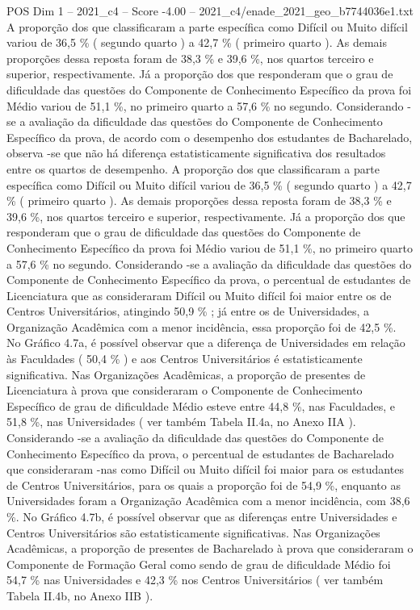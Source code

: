 \begin{textsample}{POS Dim 1 – 2021\_c4 – Score -4.00 – 2021\_c4/enade\_2021\_geo\_b7744036e1.txt}
A proporção dos que classificaram a parte específica como Difícil ou Muito difícil variou de 36,5 \% ( segundo quarto ) a 42,7 \% ( primeiro quarto ).
As demais proporções dessa reposta foram de 38,3 \% e 39,6 \%, nos quartos terceiro e superior, respectivamente.
Já a proporção dos que responderam que o grau de dificuldade das questões do Componente de Conhecimento Específico da prova foi Médio variou de 51,1 \%, no primeiro quarto a 57,6 \% no segundo.
Considerando -se a avaliação da dificuldade das questões do Componente de Conhecimento Específico da prova, de acordo com o desempenho dos estudantes de Bacharelado, observa -se que não há diferença estatisticamente significativa dos resultados entre os quartos de desempenho.
A proporção dos que classificaram a parte específica como Difícil ou Muito difícil variou de 36,5 \% ( segundo quarto ) a 42,7 \% ( primeiro quarto ).
As demais proporções dessa reposta foram de 38,3 \% e 39,6 \%, nos quartos terceiro e superior, respectivamente.
Já a proporção dos que responderam que o grau de dificuldade das questões do Componente de Conhecimento Específico da prova foi Médio variou de 51,1 \%, no primeiro quarto a 57,6 \% no segundo.
Considerando -se a avaliação da dificuldade das questões do Componente de Conhecimento Específico da prova, o percentual de estudantes de Licenciatura que as consideraram Difícil ou Muito difícil foi maior entre os de Centros Universitários, atingindo 50,9 \% ; já entre os de Universidades, a Organização Acadêmica com a menor incidência, essa proporção foi de 42,5 \%.
No Gráfico 4.7a, é possível observar que a diferença de Universidades em relação às Faculdades ( 50,4 \% ) e aos Centros Universitários é estatisticamente significativa.
Nas Organizações Acadêmicas, a proporção de presentes de Licenciatura à prova que consideraram o Componente de Conhecimento Específico de grau de dificuldade Médio esteve entre 44,8 \%, nas Faculdades, e 51,8 \%, nas Universidades ( ver também Tabela II.4a, no Anexo IIA ).
Considerando -se a avaliação da dificuldade das questões do Componente de Conhecimento Específico da prova, o percentual de estudantes de Bacharelado que consideraram -nas como Difícil ou Muito difícil foi maior para os estudantes de Centros Universitários, para os quais a proporção foi de 54,9 \%, enquanto as Universidades foram a Organização Acadêmica com a menor incidência, com 38,6 \%.
No Gráfico 4.7b, é possível observar que as diferenças entre Universidades e Centros Universitários são estatisticamente significativas.
Nas Organizações Acadêmicas, a proporção de presentes de Bacharelado à prova que consideraram o Componente de Formação Geral como sendo de grau de dificuldade Médio foi 54,7 \% nas Universidades e 42,3 \% nos Centros Universitários ( ver também Tabela II.4b, no Anexo IIB ).

\end{textsample}
